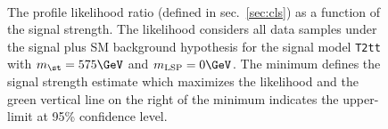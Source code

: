 \begin{figure}[t!]
  \begin{center}
     \\
    \caption{\label{fig:t2cc-best-fit}The profile likelihood ratio 
      (defined in sec.~\ref{sec:cls}) as a function of the signal strength.
      The likelihood considers all data samples under the signal plus SM 
      background hypothesis for the signal model \texttt{T2tt} with 
      $m_{\st} = 575\GeV$ and $m_{\text{LSP}} = 0\GeV$.
      The minimum defines the signal strength estimate which maximizes the
      likelihood and the green vertical line on the right of the minimum 
      indicates the upper-limit at 95\% confidence level.}
  \end{center}
\end{figure}

